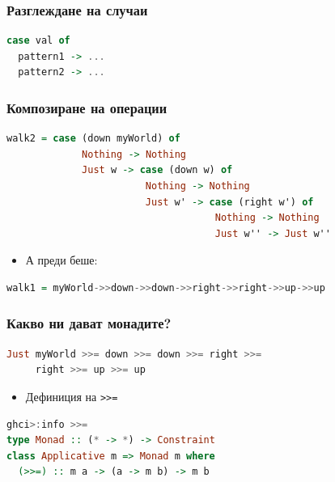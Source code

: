 \documentclass{beamer}
\begin{document}
\begin{frame}[fragile]
  \frametitle{Разглеждане на случаи}

\begin{lstlisting}[language=Haskell]
case val of
  pattern1 -> ...
  pattern2 -> ...
\end{lstlisting}

\end{frame}



\begin{frame}[fragile]
  \frametitle{Композиране на операции}

\begin{lstlisting}[language=Haskell]
walk2 = case (down myWorld) of
             Nothing -> Nothing
             Just w -> case (down w) of
                        Nothing -> Nothing
                        Just w' -> case (right w') of
                                    Nothing -> Nothing
                                    Just w'' -> Just w''

\end{lstlisting}

\begin{itemize}
  \item А преди беше:
\end{itemize}

\begin{lstlisting}[language=Haskell]
walk1 = myWorld->>down->>down->>right->>right->>up->>up
\end{lstlisting}


\end{frame}


\begin{frame}[fragile]
  \frametitle{Какво ни дават монадите?}

\begin{lstlisting}[language=Haskell]
Just myWorld >>= down >>= down >>= right >>= 
     right >>= up >>= up
\end{lstlisting}

\begin{itemize}
  \item Дефиниция на \verb#>>=#
\end{itemize}

\begin{lstlisting}[language=Haskell]
ghci>:info >>=
type Monad :: (* -> *) -> Constraint
class Applicative m => Monad m where
  (>>=) :: m a -> (a -> m b) -> m b
\end{lstlisting}
\end{frame}
\end{document}
